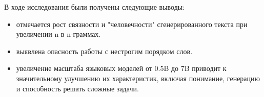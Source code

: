 
В ходе исследования были получены следующие выводы:
\begin{itemize}
    \item отмечается рост связности и "человечности" сгенерированного текста при увеличении n в n-граммах.
    \item выявлена опасность работы с нестрогим порядком слов.
    \item увеличение масштаба языковых моделей от 0.5B до 7B приводит к значительному улучшению их характеристик, 
    включая понимание, генерацию и способность решать сложные задачи.
\end{itemize}